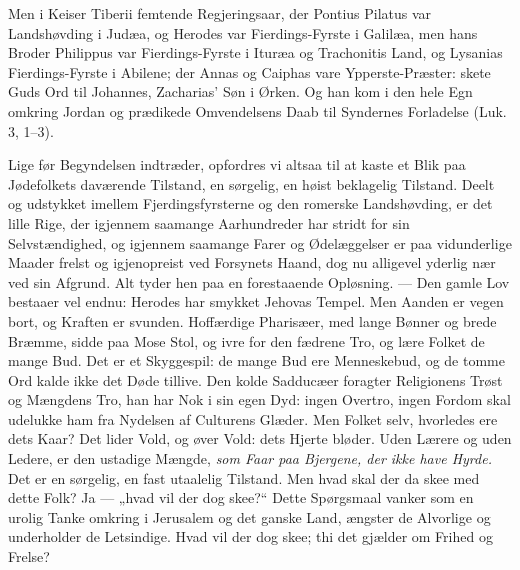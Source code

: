 \documentclass[12pt,a4paper]{book}
\begin{document}
\begingroup\large
Men i Keiser Tiberii femtende Regjeringsaar, der Pontius Pilatus var
Landshøvding i Judæa, og Herodes var Fierdings-Fyrste i Galilæa, men hans Broder
Philippus var Fierdings-Fyrste i Ituræa og Trachonitis Land, og Lysanias
Fierdings-Fyrste i Abilene; der Annas og Caiphas vare Ypperste-Præster: skete
Guds Ord til Johannes, Zacharias' Søn i Ørken. Og han kom i den hele Egn
omkring Jordan og prædikede Omvendelsens Daab til Syndernes Forladelse
(Luk. 3, 1--3).
\par\endgroup

Lige før Begyndelsen indtræder, opfordres vi altsaa til at kaste et Blik paa
Jødefolkets daværende Tilstand, en sørgelig, en høist beklagelig Tilstand. Deelt
og udstykket imellem Fjerdingsfyrsterne og den romerske Landshøvding, er det
lille Rige, der igjennem saamange Aarhundreder har stridt for sin
Selvstændighed, og igjennem saamange Farer og Ødelæggelser er paa vidunderlige
Maader frelst og igjenopreist ved Forsynets Haand, dog nu alligevel yderlig nær
ved sin Afgrund. Alt tyder hen paa en forestaaende Opløsning. --- Den gamle Lov
bestaaer vel endnu: Herodes har smykket Jehovas Tempel. Men Aanden er vegen
bort, og Kraften er svunden. Hoffærdige Pharisæer, med lange Bønner og brede
Bræmme, sidde paa Mose Stol, og ivre for den fædrene Tro, og lære Folket de
mange Bud. Det er et Skyggespil: de mange Bud ere Menneskebud, og de tomme Ord
kalde ikke det
Døde tillive. Den kolde Sadducæer foragter Religionens Trøst og Mængdens Tro,
han har Nok i sin egen Dyd: ingen Overtro, ingen Fordom skal udelukke ham fra
Nydelsen af Culturens Glæder. Men Folket selv, hvorledes ere dets Kaar? Det
lider Vold, og øver Vold: dets Hjerte bløder. Uden Lærere og uden Ledere, er den
ustadige Mængde, \emph{som Faar paa Bjergene, der ikke have Hyrde.} Det er en
sørgelig, en fast utaalelig Tilstand. Men hvad skal der da skee med dette Folk?
Ja --- „hvad vil der dog skee?“ Dette Spørgsmaal vanker som en urolig Tanke
omkring i Jerusalem og det ganske Land, ængster de Alvorlige og underholder de
Letsindige. Hvad vil der dog skee; thi det gjælder om Frihed og Frelse?
\end{document}
